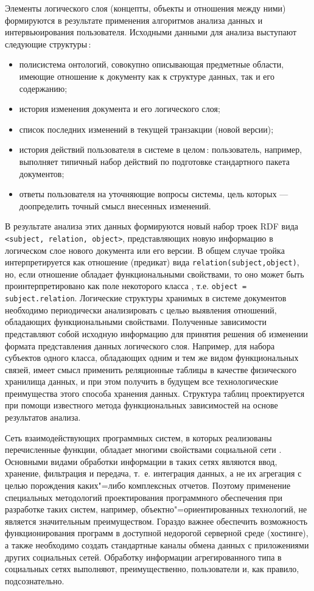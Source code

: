 \documentclass[utf8]{../IncArticle}
\begin{document}
Элементы логического слоя (концепты, объекты и отношения между ними)
формируются в результате применения алгоритмов анализа данных и
интервьюирования пользователя.  Исходными данными для анализа
выступают следующие структуры\,:
\begin{itemize}
\item полисистема онтологий, совокупно описывающая предметные области,
  имеющие отношение к документу как к структуре данных, так и его
  содержанию;
\item история изменения документа и его логического слоя;
\item список последних изменений в текущей транзакции (новой версии);
\item история действий пользователя в системе в целом\,: пользователь,
  например, выполняет типичный набор действий по подготовке
  стандартного пакета документов;
\item ответы пользователя на уточняющие вопросы системы, цель которых
  --- доопределить точный смысл внесенных изменений.
\end{itemize}

В результате анализа этих данных формируются новый набор троек RDF
вида \texttt{<subject, relation, object>}, представляющих новую
информацию в логическом слое нового документа или его версии.  В общем
случае тройка интерпретируется как отношение (предикат) вида
\texttt{relation(subject,object)}, но, если отношение обладает
функциональными свойствами, то оно может быть проинтерпретировано как
поле некоторого класса \cite{kazakovdiss}, т.е.  \texttt{object =
  subject.relation}.  Логические структуры хранимых в системе
документов необходимо периодически анализировать с целью выявления
отношений, обладающих функциональными свойствами.  Полученные
зависимости представляют собой исходную информацию для принятия
решения об изменении формата представления данных логического слоя.
Например, для набора субъектов одного класса, обладающих одним и тем
же видом функциональных связей, имеет смысл применить реляционные таблицы
в качестве физического хранилища данных, и при этом получить в будущем все
технологические преимущества этого способа хранения данных.  Структура
таблиц проектируется при помощи известного метода функциональных
зависимостей на основе результатов анализа.

Сеть взаимодействующих программных систем, в которых реализованы
перечисленные функции, обладает многими свойствами социальной сети \cite{SN}.
Основными видами обработки информации в таких сетях являются ввод,
хранение, фильтрация и передача, т.~е. интеграция данных, а не их
агрегация с целью порождения каких"=либо комплексных отчетов.  Поэтому
применение специальных методологий проектирования программного
обеспечения при разработке таких систем, например,
объектно"=ориентированных технологий, не является значительным
преимуществом.  Гораздо важнее обеспечить возможность функционирования
программ в доступной недорогой серверной среде (хостинге), а также
необходимо создать стандартные каналы обмена данных с приложениями
других социальных сетей.  Обработку информации агрегированного типа в
социальных сетях выполняют, преимущественно, пользователи и, как
правило, подсознательно.
\end{document}
